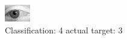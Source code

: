 \begin{figure}[h!]
\begin{center}
\includegraphics[width=0.60\columnwidth]{figures/ID2843_class_4_target_3.png}
\end{center}
\caption{ Classification: 4 actual target: 3}
\label{fig:ID2843_class_4_target_3}
\end{figure}
